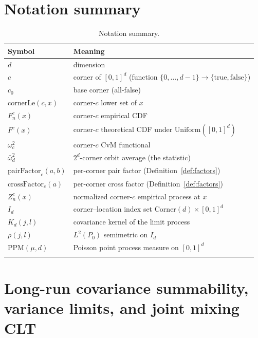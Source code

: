 \documentclass[pdflatex]{sn-jnl}
\theoremstyle{thmstyleone}
\theoremstyle{thmstyletwo}
\theoremstyle{thmstylethree}
\newcounter{maintablecount}
\begin{document}
\setcounter{maintablecount}{\value{table}}
\newpage
\begin{appendices}

\setcounter{table}{\value{maintablecount}}
\renewcommand{\thetable}{\arabic{table}}
\renewcommand{\theHtable}{\arabic{table}}
\renewcommand{\theHequation}{\Alph{section}.\arabic{equation}}

\section{Notation summary}\label{sec:notation}

\begin{table}[htbp]
\caption{Notation summary.}\label{tab:notation}
\begin{tabular*}{\textwidth}{@{\extracolsep\fill}ll}
\toprule
Symbol & Meaning \\
\midrule
$d$ & dimension \\
$c$ & corner of $[0,1]^d$ (function $\{0,\dots,d-1\}\to\{\mathrm{true},\mathrm{false}\}$) \\
$c_0$ & base corner (all-false) \\
$\mathrm{cornerLe}(c,x)$ & corner-$c$ lower set of $x$ \\
$F_n^c(x)$ & corner-$c$ empirical CDF \\
$F^c(x)$ & corner-$c$ theoretical CDF under $\mathrm{Uniform}([0,1]^d)$ \\
$\omega^2_c$ & corner-$c$ CvM functional \\
$\bar\omega^2_d$ & $2^d$-corner orbit average (the statistic) \\
$\mathrm{pairFactor}_c(a,b)$ & per-corner pair factor (Definition~\ref{def:factors}) \\
$\mathrm{crossFactor}_c(a)$ & per-corner cross factor (Definition~\ref{def:factors}) \\
$Z_n^c(x)$ & normalized corner-$c$ empirical process at $x$ \\
$I_d$ & corner--location index set $\mathrm{Corner}(d)\times[0,1]^d$ \\
$K_d(j,l)$ & covariance kernel of the limit process \\
$\rho(j,l)$ & $L^2(P_0)$ semimetric on $I_d$ \\
$\mathrm{PPM}(\mu,d)$ & Poisson point process measure on $[0,1]^d$ \\
\botrule
\end{tabular*}
\end{table}

\section{Long-run covariance summability, variance limits, and joint mixing CLT}\label{app:mixing-summability}


\end{appendices}
\end{document}
